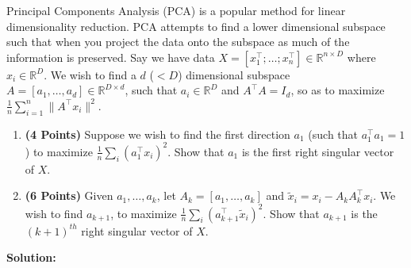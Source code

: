 \documentclass[a4paper]{article}
\theoremstyle{definition}
\newcommand{\RR}{\mathbb{R}}
\begin{document}
Principal Components Analysis (PCA) is a popular method for linear dimensionality reduction. PCA attempts to find a lower dimensional subspace such that when you project the data onto the subspace as much of the information is preserved. Say we have data $X = [x_1^\top; \dots; x_n^\top] \in \RR^{n\times D}$ where  $x_i \in \RR^D$. We wish to find a $d$ ($ < D$) dimensional subspace $A = [a_1, \dots, a_d] \in \RR^{D\times d}$, such that $ a_i \in \RR^D$ and $A^\top A = I_d$, so as to maximize $\frac{1}{n} \sum_{i=1}^n \|A^\top x_i\|^2$.
\begin{enumerate}

\item  \textbf{(4 Points)}
Suppose we wish to find the first direction $a_1$ (such that $a_1^\top a_1 = 1$) to maximize $\frac{1}{n} \sum_i (a_1^\top x_i)^2$.
Show that $a_1$ is the first right singular vector of $X$.

\item  \textbf{(6 Points)}
Given $a_1, \dots, a_k$, let $A_k = [a_1, \dots, a_k]$ and 
$\tilde{x}_i = x_i - A_kA_k^\top x_i$. We wish to find $a_{k+1}$, to maximize
$\frac{1}{n} \sum_i (a_{k+1}^\top \tilde{x}_i)^2$. Show that $a_{k+1}$ is the
$(k+1)^{th}$ right singular vector of $X$.


\end{enumerate}

\textbf{Solution: }\\
\end{document}

